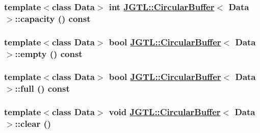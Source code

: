 \hypertarget{class_j_g_t_l_1_1_circular_buffer_1d45bb2d7be87cd4f64fdd687b4a8543}{
\subsubsection[capacity]{\setlength{\rightskip}{0pt plus 5cm}template$<$class Data$>$ int \hyperlink{class_j_g_t_l_1_1_circular_buffer}{JGTL::Circular\-Buffer}$<$ Data $>$::capacity () const}}
\label{class_j_g_t_l_1_1_circular_buffer_1d45bb2d7be87cd4f64fdd687b4a8543}


\hypertarget{class_j_g_t_l_1_1_circular_buffer_c810afb60a4a8ede12bd30640d4577c7}{
\subsubsection[empty]{\setlength{\rightskip}{0pt plus 5cm}template$<$class Data$>$ bool \hyperlink{class_j_g_t_l_1_1_circular_buffer}{JGTL::Circular\-Buffer}$<$ Data $>$::empty () const}}
\label{class_j_g_t_l_1_1_circular_buffer_c810afb60a4a8ede12bd30640d4577c7}


\hypertarget{class_j_g_t_l_1_1_circular_buffer_29de08a95860346efcc84893aba71c73}{
\subsubsection[full]{\setlength{\rightskip}{0pt plus 5cm}template$<$class Data$>$ bool \hyperlink{class_j_g_t_l_1_1_circular_buffer}{JGTL::Circular\-Buffer}$<$ Data $>$::full () const}}
\label{class_j_g_t_l_1_1_circular_buffer_29de08a95860346efcc84893aba71c73}


\hypertarget{class_j_g_t_l_1_1_circular_buffer_7c38e5b1c21dd3ab9c9e5b4f269ce3b8}{
\subsubsection[clear]{\setlength{\rightskip}{0pt plus 5cm}template$<$class Data$>$ void \hyperlink{class_j_g_t_l_1_1_circular_buffer}{JGTL::Circular\-Buffer}$<$ Data $>$::clear ()}}
\label{class_j_g_t_l_1_1_circular_buffer_7c38e5b1c21dd3ab9c9e5b4f269ce3b8}


